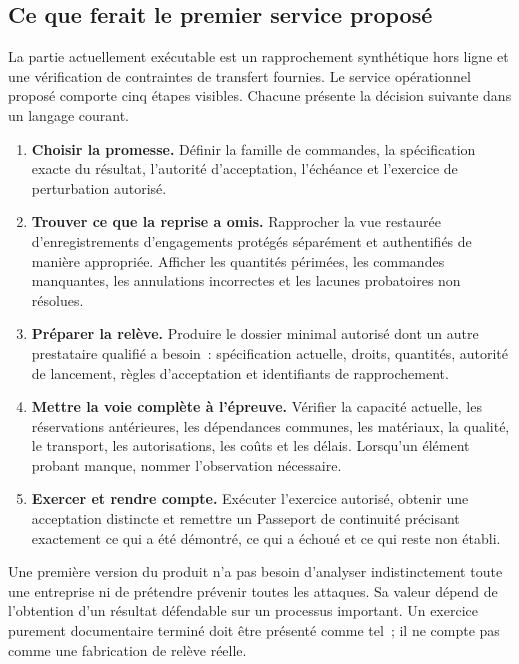 \documentclass[11pt,a4paper]{article}
\begin{document}
\subsection{Ce que ferait le premier service proposé}
La partie actuellement exécutable est un rapprochement synthétique hors ligne et une vérification de contraintes de transfert fournies. Le service opérationnel proposé comporte cinq étapes visibles. Chacune présente la décision suivante dans un langage courant.
\begin{enumerate}
\item \textbf{Choisir la promesse.} Définir la famille de commandes, la spécification exacte du résultat, l’autorité d’acceptation, l’échéance et l’exercice de perturbation autorisé.
\item \textbf{Trouver ce que la reprise a omis.} Rapprocher la vue restaurée d’enregistrements d’engagements protégés séparément et authentifiés de manière appropriée. Afficher les quantités périmées, les commandes manquantes, les annulations incorrectes et les lacunes probatoires non résolues.
\item \textbf{Préparer la relève.} Produire le dossier minimal autorisé dont un autre prestataire qualifié a besoin~: spécification actuelle, droits, quantités, autorité de lancement, règles d’acceptation et identifiants de rapprochement.
\item \textbf{Mettre la voie complète à l’épreuve.} Vérifier la capacité actuelle, les réservations antérieures, les dépendances communes, les matériaux, la qualité, le transport, les autorisations, les coûts et les délais. Lorsqu’un élément probant manque, nommer l’observation nécessaire.
\item \textbf{Exercer et rendre compte.} Exécuter l’exercice autorisé, obtenir une acceptation distincte et remettre un Passeport de continuité précisant exactement ce qui a été démontré, ce qui a échoué et ce qui reste non établi.
\end{enumerate}
Une première version du produit n’a pas besoin d’analyser indistinctement toute une entreprise ni de prétendre prévenir toutes les attaques. Sa valeur dépend de l’obtention d’un résultat défendable sur un processus important. Un exercice purement documentaire terminé doit être présenté comme tel~; il ne compte pas comme une fabrication de relève réelle.
\end{document}
